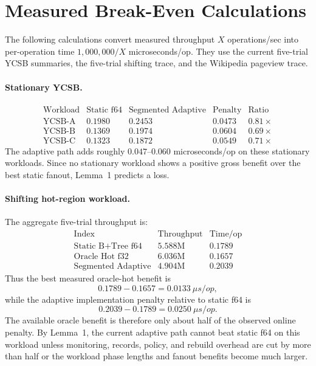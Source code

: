 \section{Measured Break-Even Calculations}
\label{sec:measured-break-even}

The following calculations convert measured throughput $X$ operations/sec into
per-operation time $1{,}000{,}000/X$ microseconds/op.  They use the current
five-trial YCSB summaries, the five-trial shifting trace, and the Wikipedia
pageview trace.

\paragraph{Stationary YCSB.}
\[
\begin{array}{lrrrr}
\text{Workload} & \text{Static f64} & \text{Segmented Adaptive}
& \text{Penalty} & \text{Ratio} \\
\hline
\text{YCSB-A} & 0.1980 & 0.2453 & 0.0473 & 0.81\times \\
\text{YCSB-B} & 0.1369 & 0.1974 & 0.0604 & 0.69\times \\
\text{YCSB-C} & 0.1323 & 0.1872 & 0.0549 & 0.71\times
\end{array}
\]
The adaptive path adds roughly $0.047$--$0.060$ microseconds/op on these
stationary workloads.  Since no stationary workload shows a positive gross
benefit over the best static fanout, Lemma~1 predicts a loss.

\paragraph{Shifting hot-region workload.}
The aggregate five-trial throughput is:
\[
\begin{array}{lrr}
\text{Index} & \text{Throughput} & \text{Time/op} \\
\hline
\text{Static B+Tree f64} & 5.588\text{M} & 0.1789 \\
\text{Oracle Hot f32} & 6.036\text{M} & 0.1657 \\
\text{Segmented Adaptive} & 4.904\text{M} & 0.2039
\end{array}
\]
Thus the best measured oracle-hot benefit is
\[
  0.1789 - 0.1657 = 0.0133\ \mu s/op,
\]
while the adaptive implementation penalty relative to static f64 is
\[
  0.2039 - 0.1789 = 0.0250\ \mu s/op.
\]
The available oracle benefit is therefore only about half of the observed
online penalty.  By Lemma~1, the current adaptive path cannot beat static f64 on
this workload unless monitoring, records, policy, and rebuild overhead are cut
by more than half or the workload phase lengths and fanout benefits become much
larger.

